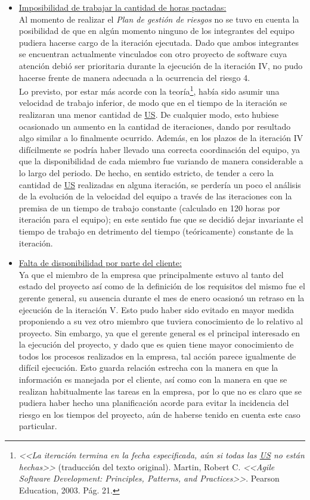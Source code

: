 \documentclass[a4paper, 12pt,twoside]{report}  %
\numberwithin{equation}{subsection} %
\begin{document}
\begin{itemize}
	\item \underline{Imposibilidad de trabajar la cantidad de horas pactadas:}\\
	Al momento de realizar el \textit{Plan de gestión de riesgos} no se tuvo en cuenta la posibilidad de que en algún momento ninguno de los integrantes del equipo pudiera hacerse cargo de la iteración ejecutada. Dado que ambos integrantes se encuentran actualmente vinculados con otro proyecto de software cuya atención debió ser prioritaria durante la ejecución de la iteración IV, no pudo hacerse frente de manera adecuada a la ocurrencia del riesgo 4.\\
	Lo previsto, por estar más acorde con la teoría\footnote{\textit{<<La iteración termina en la fecha especificada, aún si todas las \hyperlink{US}{US} no están hechas>>} (traducción del texto original). Martin, Robert C. \textit{<<Agile Software Development: Principles, Patterns, and Practices>>}.  Pearson Education, 2003. Pág. 21.}, había sido asumir una velocidad de trabajo inferior, de modo que en el tiempo de la iteración se realizaran una menor cantidad de \hyperlink{US}{US}. De cualquier modo, esto hubiese ocasionado un aumento en la cantidad de iteraciones, dando por resultado algo similar a lo finalmente ocurrido. Además, en los plazos de la iteración IV difícilmente se podría haber llevado una correcta coordinación del equipo, ya que la disponibilidad de cada miembro fue variando de manera considerable a lo largo del periodo. De hecho, en sentido estricto, de tender a cero la cantidad de \hyperlink{US}{US} realizadas en alguna iteración, se perdería un poco el análisis de la evolución de la velocidad del equipo a través de las iteraciones con la premisa de un tiempo de trabajo constante (calculado en 120 horas por iteración para el equipo); en este sentido fue que se decidió dejar invariante el tiempo de trabajo en detrimento del tiempo (teóricamente) constante de la iteración.
	\item \underline{Falta de disponibilidad por parte del cliente:}\\
	Ya que el miembro de la empresa que principalmente estuvo al tanto del estado del proyecto así como de la definición de los requisitos del mismo fue el gerente general, su ausencia durante el mes de enero ocasionó un retraso en la ejecución de la iteración V. Esto pudo haber sido evitado en mayor medida proponiendo a su vez otro miembro que tuviera conocimiento de lo relativo al proyecto. Sin embargo, ya que el gerente general es el principal interesado en la ejecución del proyecto, y dado que es quien tiene mayor conocimiento de todos los procesos realizados en la empresa, tal acción parece igualmente de difícil ejecución. Esto guarda relación estrecha con la manera en que la información es manejada por el cliente, así como con la manera en que se realizan habitualmente las tareas en la empresa, por lo que no es claro que se pudiera haber hecho una planificación acorde para evitar la incidencia del riesgo en los tiempos del proyecto, aún de haberse tenido en cuenta este caso particular.
\end{itemize}
\end{document}
